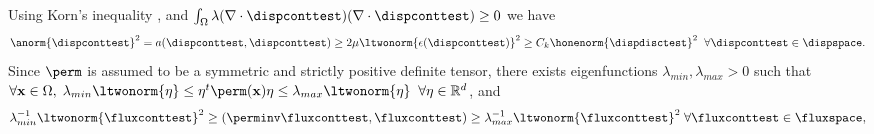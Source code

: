 Using Korn's inequality \cite{brenner2008mathematical,ciarlet2002}, and $\int_{\Omega} \lambda (\nabla \cdot \dispconttest  )(\nabla \cdot \dispconttest  ) \geq 0 $ we have
\begin{equation}
\anorm{\dispconttest}^{2}=a( \dispconttest,\dispconttest)\geq 2\mu \ltwonorm{\epsilon(\dispconttest)}^{2}\geq C_{k}\honenorm{\dispdisctest}^{2}\;\;\forall \dispconttest \in \dispspace.
\label{eqn:a_coercive}
\end{equation}
Since $\perm$ is assumed to be a symmetric and strictly positive definite tensor, there exists eigenfunctions $\lambda_{min},\lambda_{max} > 0 $ such that $\forall \mathbf{x} \in \Omega, \; \lambda_{min} \ltwonorm{\mathcal{\mathbf{\eta}}} \leq  \mathbf{\eta}^{t} \perm(\mathbf{x})\mathbf{\eta} \leq  \lambda_{max} \ltwonorm{\mathcal{\mathbf{\eta}}} \;\; \forall \mathbf{\eta} \in \mathbb{R}^{d}$, and
\begin{equation}
\label{eqn:m_coercive}
{\lambda_{min}^{-1}}\ltwonorm{\fluxconttest}^{2} \geq (\perminv \fluxconttest,\fluxconttest) \geq {\lambda_{max}^{-1}}\ltwonorm{\fluxconttest}^{2} \; \forall \fluxconttest \in \fluxspace,
\end{equation}

